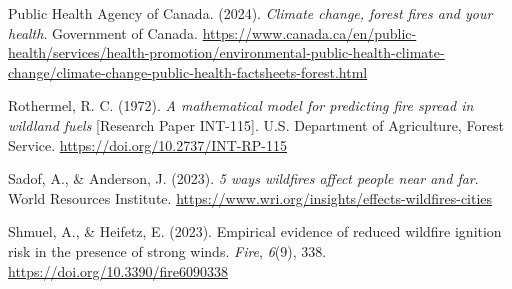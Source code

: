 \documentclass[
]{article}
\newlength{\cslhangindent}
\newenvironment{CSLReferences}[2] %
 {\begin{list}{}{%
  \setlength{\itemindent}{0pt}
  \setlength{\leftmargin}{0pt}
  \setlength{\parsep}{0pt}
  \ifodd #1
   \setlength{\leftmargin}{\cslhangindent}
   \setlength{\itemindent}{-1\cslhangindent}
  \fi
  \setlength{\itemsep}{#2\baselineskip}}}
 {\end{list}}
\begin{document}
\begin{CSLReferences}{1}{0}
Public Health Agency of Canada. (2024). \emph{Climate change, forest
fires and your health}. Government of Canada.
\url{https://www.canada.ca/en/public-health/services/health-promotion/environmental-public-health-climate-change/climate-change-public-health-factsheets-forest.html}

Rothermel, R. C. (1972). \emph{A mathematical model for predicting fire
spread in wildland fuels} {[}Research Paper INT-115{]}. U.S. Department
of Agriculture, Forest Service. \url{https://doi.org/10.2737/INT-RP-115}

Sadof, A., \& Anderson, J. (2023). \emph{5 ways wildfires affect people
near and far}. World Resources Institute.
\url{https://www.wri.org/insights/effects-wildfires-cities}

Shmuel, A., \& Heifetz, E. (2023). Empirical evidence of reduced
wildfire ignition risk in the presence of strong winds. \emph{Fire},
\emph{6}(9), 338. \url{https://doi.org/10.3390/fire6090338}

\end{CSLReferences}
\end{document}
